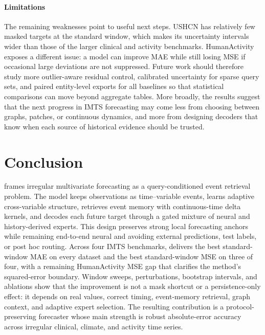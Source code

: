 \documentclass[preprint,12pt]{elsarticle}
\begin{document}
\paragraph{Limitations}
The remaining weaknesses point to useful next steps. USHCN has relatively few
masked targets at the standard window, which makes its uncertainty intervals
wider than those of the larger clinical and activity benchmarks. HumanActivity
exposes a different issue: a model can improve MAE while still losing MSE if
occasional large deviations are not suppressed.
Future work should therefore study more outlier-aware residual control,
calibrated uncertainty for sparse query sets, and paired entity-level exports
for all baselines so that statistical comparisons can move beyond aggregate
tables. More broadly, the results suggest that the next progress in IMTS
forecasting may come less from choosing between graphs, patches, or continuous
dynamics, and more from designing decoders that know when each source of
historical evidence should be trusted.

\section{Conclusion}
\label{sec:conclusion}

\method{} frames irregular multivariate forecasting as a query-conditioned
event retrieval problem. The model keeps observations as time--variable events,
learns adaptive cross-variable structure, retrieves event memory with
continuous-time delta kernels, and decodes each future target through a gated
mixture of neural and history-derived experts. This design preserves strong
local forecasting anchors while remaining end-to-end neural and avoiding
external predictions, test labels, or post hoc routing. Across four IMTS benchmarks, \method{} delivers the best standard-window MAE on
every dataset and the best standard-window MSE on three of four, with a
remaining HumanActivity MSE gap that clarifies the method's squared-error
boundary. Window sweeps, perturbations, bootstrap intervals, and ablations show
that the improvement is not a mask shortcut or a persistence-only effect: it
depends on real values, correct timing, event-memory retrieval, graph context,
and adaptive expert selection. The resulting contribution is a
protocol-preserving forecaster whose main strength is robust absolute-error
accuracy across irregular clinical, climate, and activity time series.



\end{document}
